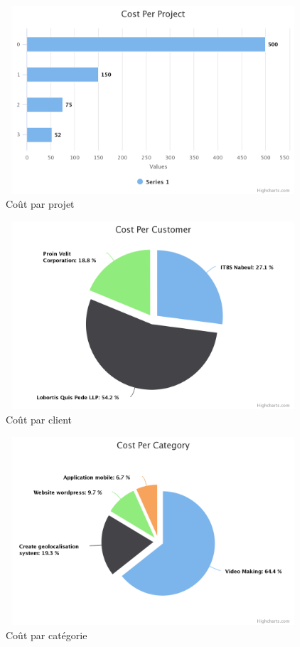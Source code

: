 \FloatBarrier
\begin{figure}[H]
\center
\includegraphics[width=11cm,height=7cm]{./figures/pres/cost-per-project.png}
\caption{ Co\^{u}t par projet }
\end{figure}
\FloatBarrier

\FloatBarrier
\begin{figure}[H]
\center
\includegraphics[width=11cm,height=7cm]{./figures/pres/cost-per-customer.png}
\caption{ Co\^{u}t par client }
\end{figure}
\FloatBarrier

\FloatBarrier
\begin{figure}[H]
\center
\includegraphics[width=11cm,height=7cm]{./figures/pres/cost-per-category.png}
\caption{ Co\^{u}t par cat\'{e}gorie}
\end{figure}
\FloatBarrier

